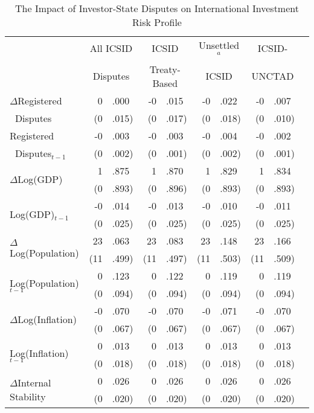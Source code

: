 \documentclass[12pt,onesided]{amsart}
\begin{document}
\begin{table}[ht]
\vspace{1cm}
\centering
{\footnotesize
\caption{The Impact of Investor-State Disputes on International Investment Risk Profile}
\label{tab:ecm}
\begin{tabular}{lr@{} lr@{}lr@{}lr@{}lr@{}}
	\hline\hline
	~ & \multicolumn{2}{c}{All ICSID} & \multicolumn{2}{c}{ICSID}  & \multicolumn{2}{c}{Unsettled$^{a}$} & \multicolumn{2}{c}{ICSID-} \\
	~ & \multicolumn{2}{c}{Disputes} & \multicolumn{2}{c}{Treaty-Based} & \multicolumn{2}{c}{ICSID} &  \multicolumn{2}{c}{UNCTAD}  \\
	\hline
  $\Delta$Registered & 0&.000 & -0&.015 & -0&.022 & -0&.007 \\
  $\;\;$Disputes & (0&.015) & (0&.017) & (0&.018) & (0&.010) \\
  Registered & -0&.003 & -0&.003 & -0&.004 & -0&.002 \\
  $\;\;$Disputes$_{t-1}$ & (0&.002) &  (0&.001) & (0&.002) & (0&.001) \\
  \multirow{2}{*}{$\Delta$Log(GDP)} & 1&.875 & 1&.870 & 1&.829 & 1&.834 \\
  & (0&.893) & (0&.896) & (0&.893) & (0&.893) \\
  \multirow{2}{*}{Log(GDP)$_{t-1}$} & -0&.014 & -0&.013 & -0&.010 & -0&.011\\
  & (0&.025) & (0&.025) & (0&.025) & (0&.025) \\
  \multirow{2}{*}{$\Delta$Log(Population)} & 23&.063 & 23&.083 & 23&.148 & 23&.166 \\
  & (11&.499) & (11&.497) & (11&.503) & (11&.509)\\
  \multirow{2}{*}{Log(Population)$_{t-1}$} & 0&.123 & 0&.122 & 0&.119 & 0&.119 \\
  & (0&.094) & (0&.094) & (0&.094) & (0&.094) \\
  \multirow{2}{*}{$\Delta$Log(Inflation)} & -0&.070 &  -0&.070 &  -0&.071 &  -0&.070 \\
  & (0&.067) &  (0&.067) &  (0&.067) &  (0&.067) \\
  \multirow{2}{*}{Log(Inflation)$_{t-1}$} & 0&.013 &  0&.013 &  0&.013 &  0&.013 \\
  & (0&.018) &  (0&.018) &  (0&.018) &  (0&.018) \\
  \multirow{2}{*}{$\Delta$Internal Stability} & 0&.026 & 0&.026 &  0&.026 &  0&.026 \\
  & (0&.020) &  (0&.020) &  (0&.020) &  (0&.020) \\

\end{tabular}}
\end{table}
\end{document}
